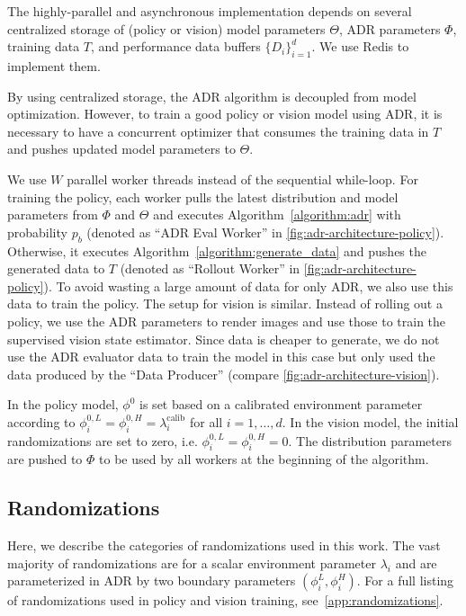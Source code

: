 The highly-parallel and asynchronous implementation depends on several centralized storage of (policy or vision) model parameters $\Theta$,  ADR parameters $\Phi$, training data $T$, and performance data buffers $\{D_i\}_{i=1}^d$. We use Redis to implement them.

By using centralized storage, the ADR algorithm is decoupled from model optimization. However, to train a good policy or vision model using ADR, it is necessary to have a concurrent optimizer that consumes the training data in $T$ and pushes updated model parameters to $\Theta$.

We use $W$ parallel worker threads instead of the sequential while-loop. For training the policy, each worker pulls the latest distribution and model parameters from $\Phi$ and $\Theta$ and executes Algorithm~\ref{algorithm:adr} with probability $p_b$ (denoted as ``ADR Eval Worker'' in \autoref{fig:adr-architecture-policy}). Otherwise, it executes Algorithm~\ref{algorithm:generate_data} and pushes the generated data to $T$ (denoted as ``Rollout Worker'' in \autoref{fig:adr-architecture-policy}). To avoid wasting a large amount of data for only ADR, we also use this data to train the policy. The setup for vision is similar. Instead of rolling out a policy, we use the ADR parameters to render images and use those to train the supervised vision state estimator. Since data is cheaper to generate, we do not use the ADR evaluator data to train the model in this case but only used the data produced by the ``Data Producer'' (compare \autoref{fig:adr-architecture-vision}).

In the policy model, $\phi^{0}$ is set based on a calibrated environment parameter according to $\phi^{0, L}_i = \phi^{0, H}_i = \lambda_{i}^\text{calib}$ for all $i = 1, \dots, d$. In the vision model, the initial randomizations are set to zero, i.e. $\phi^{0, L}_i = \phi^{0, H}_i = 0$. The distribution parameters are pushed to $\Phi$ to be used by all workers at the beginning of the algorithm.

\subsection{Randomizations}

Here, we describe the categories of randomizations used in this work. The vast majority of randomizations are for a scalar environment parameter $\lambda_i$ and are parameterized in ADR by two boundary parameters $(\phi^L_i, \phi^H_i)$. For a full listing of randomizations used in policy and vision training, see~\autoref{app:randomizations}.

